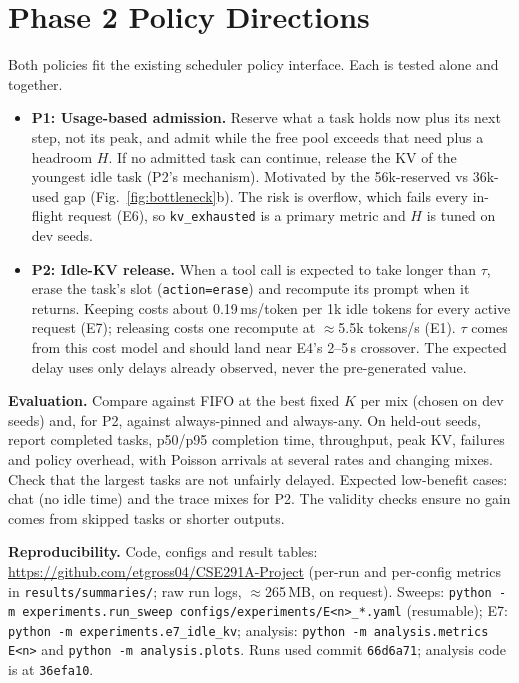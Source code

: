 \documentclass[10pt]{article}
\begin{document}
\section{Phase 2 Policy Directions}
Both policies fit the existing scheduler policy interface. Each is tested alone and together.
\begin{itemize}
\item \textbf{P1: Usage-based admission.} Reserve what a task holds now plus its next step, not its peak, and admit while
the free pool exceeds that need plus a headroom $H$. If no admitted task can continue, release the KV of the youngest
idle task (P2's mechanism). Motivated by the 56k-reserved vs 36k-used gap (Fig.~\ref{fig:bottleneck}b). The risk is
overflow, which fails every in-flight request (E6), so \texttt{kv\_exhausted} is a primary metric and $H$ is tuned on
dev seeds.
\item \textbf{P2: Idle-KV release.} When a tool call is expected to take longer than $\tau$, erase the task's slot
(\texttt{action=erase}) and recompute its prompt when it returns. Keeping costs about 0.19\,ms/token per 1k idle tokens
for every active request (E7); releasing costs one recompute at $\approx$5.5k tokens/s (E1). $\tau$ comes from this cost
model and should land near E4's 2--5\,s crossover. The expected delay uses only delays already observed, never the
pre-generated value.
\end{itemize}
\textbf{Evaluation.} Compare against FIFO at the best fixed $K$ per mix (chosen on dev seeds) and, for P2, against
always-pinned and always-any. On held-out seeds, report completed tasks, p50/p95 completion time, throughput, peak KV,
failures and policy overhead, with Poisson arrivals at several rates and changing mixes. Check that the largest tasks are
not unfairly delayed. Expected low-benefit cases: chat (no idle time) and the trace mixes for P2. The validity checks
ensure no gain comes from skipped tasks or shorter outputs.

\textbf{Reproducibility.} Code, configs and result tables:
\url{https://github.com/etgross04/CSE291A-Project} (per-run and per-config metrics in \texttt{results/summaries/}; raw
run logs, $\approx$265\,MB, on request). Sweeps: \texttt{python -m experiments.run\_sweep configs/experiments/E<n>\_*.yaml}
(resumable); E7: \texttt{python -m experiments.e7\_idle\_kv}; analysis: \texttt{python -m analysis.metrics E<n>} and
\texttt{python -m analysis.plots}. Runs used commit \texttt{66d6a71}; analysis code is at \texttt{36efa10}.
\end{document}
